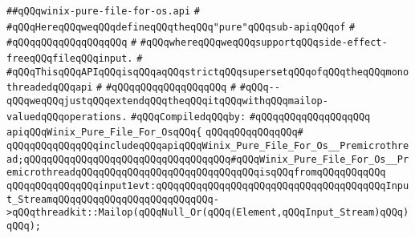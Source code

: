 \label{src/lib/std/src/io/winix-pure-file-for-os.api}
\verb|##qQQqwinix-pure-file-for-os.api|\newline
\verb|#|\newline
\verb|#qQQqHereqQQqweqQQqdefineqQQqtheqQQq"pure"qQQqsub-apiqQQqof|\newline
\verb|#|\newline
\verb|#qQQqqQQqqQQqqQQqqQQq|\newline
\verb|#|\newline
\verb|#qQQqwhereqQQqweqQQqsupportqQQqside-effect-freeqQQqfileqQQqinput.|\newline
\verb|#|\newline
\verb|#qQQqThisqQQqAPIqQQqisqQQqaqQQqstrictqQQqsupersetqQQqofqQQqtheqQQqmonothreadedqQQqapi|\newline
\verb|#|\newline
\verb|#qQQqqQQqqQQqqQQqqQQq|\newline
\verb|#|\newline
\verb|#qQQq--qQQqweqQQqjustqQQqextendqQQqtheqQQqitqQQqwithqQQqmailop-valuedqQQqoperations.|\newline
\newline
\verb|#qQQqCompiledqQQqby:|\newline
\verb|#qQQqqQQqqQQqqQQqqQQq|\newline
\newline
\newline
\newline
\verb|apiqQQqWinix_Pure_File_For_OsqQQq{|\newline
\verb|qQQqqQQqqQQqqQQq#|\newline
\verb|qQQqqQQqqQQqqQQqincludeqQQqapiqQQqWinix_Pure_File_For_Os__Premicrothread;qQQqqQQqqQQqqQQqqQQqqQQqqQQqqQQqqQQq#qQQqWinix_Pure_File_For_Os__PremicrothreadqQQqqQQqqQQqqQQqqQQqqQQqqQQqqQQqisqQQqfromqQQqqQQqqQQq|\newline
\newline
\verb|qQQqqQQqqQQqqQQqinput1evt:qQQqqQQqqQQqqQQqqQQqqQQqqQQqqQQqqQQqqQQqInput_StreamqQQqqQQqqQQqqQQqqQQqqQQqqQQq->qQQqthreadkit::Mailop(qQQqNull_Or(qQQq(Element,qQQqInput_Stream)qQQq)qQQq);|\newline
